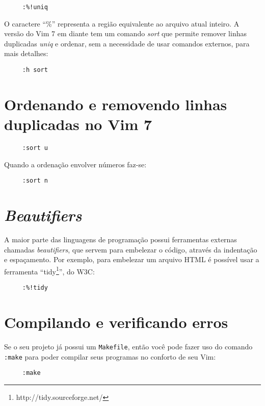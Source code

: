 \begin{verbatim}
     :%!uniq
\end{verbatim}

O caractere ``\%'' representa a região equivalente ao arquivo atual inteiro.
A versão do Vim 7 em diante tem um comando {\em sort} que permite remover
linhas duplicadas {\em uniq} e ordenar, sem a necessidade de usar comandos
externos, para mais detalhes:

\begin{verbatim}
     :h sort
\end{verbatim}

\section{Ordenando e removendo linhas duplicadas no Vim 7}

\begin{verbatim}
     :sort u
\end{verbatim}

Quando a ordenação envolver números faz-se:

\begin{verbatim}
     :sort n
\end{verbatim}

\section{{\em Beautifiers}}

A maior parte das linguagens de programação possui ferramentas
externas chamadas {\em beautifiers}, que servem para embelezar o código,
através da indentação e espaçamento. Por exemplo, para embelezar um
arquivo HTML é possível usar a ferramenta ``tidy\footnote{http://tidy.sourceforge.net/}'', do W3C:

\begin{verbatim}
     :%!tidy
\end{verbatim}

\section{Compilando e verificando erros}
Se o seu projeto já possui um {\tt Makefile}, então você pode fazer uso do comando
{\tt :make} para poder compilar seus programas no conforto de seu Vim:

\begin{verbatim}
     :make
\end{verbatim}

